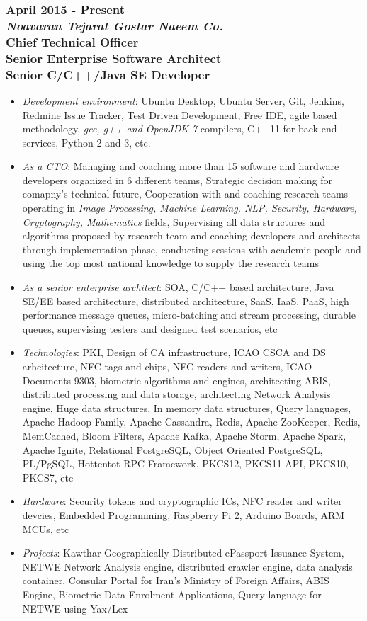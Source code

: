\documentclass[10pt,a4paper]{article}
\begin{document}
\subsubsection{{April 2015 - Present} \\ \textnormal {\textit {Noavaran Tejarat Gostar Naeem Co.}} \\ {Chief Technical Officer \\ Senior Enterprise Software Architect \\ Senior C/C++/Java SE Developer}}
  \setlength{\leftskip}{0.5cm}
  \setlength{\rightskip}{1cm}
  \begin{itemize}
    \setlength{\rightskip}{1cm}
    \setlength\itemsep{0em}
    \item \small \textit {Development environment}: Ubuntu Desktop, Ubuntu Server, Git, Jenkins, Redmine Issue Tracker, Test Driven Development, Free IDE, agile based methodology, \textit {gcc, g++ and OpenJDK 7} compilers, C++11 for back-end services, Python 2 and 3, etc.
    \item \small \textit {As a CTO}: Managing and coaching more than 15 software and hardware developers organized in 6 different teams, Strategic decision making for comapny's technical future, Cooperation with and coaching research teams operating in \textit {Image Processing, Machine Learning, NLP, Security, Hardware, Cryptography, Mathematics} fields, Supervising all data structures and algorithms proposed by research team and coaching developers and architects through implementation phase, conducting sessions with academic people and using the top most national knowledge to supply the research teams
    \item \small \textit {As a senior enterprise architect}: SOA, C/C++ based architecture, Java SE/EE based architecture, distributed architecture, SaaS, IaaS, PaaS, high performance message queues, micro-batching and stream processing, durable queues, supervising testers and designed test scenarios, etc
    \item \small \textit {Technologies}: PKI, Design of CA infrastructure, ICAO CSCA and DS arhcitecture, NFC tags and chips, NFC readers and writers, ICAO Documents 9303, biometric algorithms and engines, architecting ABIS, distributed processing and data storage, architecting Network Analysis engine, Huge data structures, In memory data structures, Query languages, Apache Hadoop Family, Apache Cassandra, Redis, Apache ZooKeeper, Redis, MemCached, Bloom Filters, Apache Kafka, Apache Storm, Apache Spark, Apache Ignite, Relational PostgreSQL, Object Oriented PostgreSQL, PL/PgSQL, Hottentot RPC Framework, PKCS12, PKCS11 API, PKCS10, PKCS7, etc
    \item \small \textit {Hardware}: Security tokens and cryptographic ICs, NFC reader and writer devcies, Embedded Programming, Raspberry Pi 2, Arduino Boards, ARM MCUs, etc
    \item \small \textit {Projects}: Kawthar Geographically Distributed ePassport Issuance System, NETWE Network Analysis engine, distributed crawler engine, data analysis container, Consular Portal for Iran's Ministry of Foreign Affairs, ABIS Engine, Biometric Data Enrolment Applications, Query language for NETWE using Yax/Lex
  \end{itemize}
\end{document}
